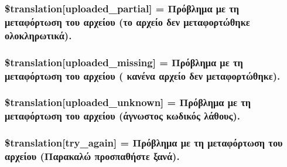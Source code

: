 \subsubsection[{\$translation}]{\setlength{\rightskip}{0pt plus 5cm}\$translation\mbox{[}\textquotesingle{}uploaded\+\_\+partial\textquotesingle{}\mbox{]} = \textquotesingle{}Πρόβλημα με τη μεταφόρτωση του αρχείου (το αρχείο δεν μεταφορτώθηκε ολοκληρωτικά).\textquotesingle{}}\label{class_8upload_8el___g_r_8php_a967c17da21b0a2d3bd65cca3a9ca0ea8}
\hypertarget{class_8upload_8el___g_r_8php_a0cce433260be65f1f35853a6b4b8952b}{}
\subsubsection[{\$translation}]{\setlength{\rightskip}{0pt plus 5cm}\$translation\mbox{[}\textquotesingle{}uploaded\+\_\+missing\textquotesingle{}\mbox{]} = \textquotesingle{}Πρόβλημα με τη μεταφόρτωση του αρχείου ( κανένα αρχείο δεν μεταφορτώθηκε).\textquotesingle{}}\label{class_8upload_8el___g_r_8php_a0cce433260be65f1f35853a6b4b8952b}
\hypertarget{class_8upload_8el___g_r_8php_a4a9168e922b827e6a28b5db1c00774ca}{}
\subsubsection[{\$translation}]{\setlength{\rightskip}{0pt plus 5cm}\$translation\mbox{[}\textquotesingle{}uploaded\+\_\+unknown\textquotesingle{}\mbox{]} = \textquotesingle{}Πρόβλημα με τη μεταφόρτωση του αρχείου (άγνωστος κωδικός λάθους).\textquotesingle{}}\label{class_8upload_8el___g_r_8php_a4a9168e922b827e6a28b5db1c00774ca}
\hypertarget{class_8upload_8el___g_r_8php_a3afc377bd803683314f413a814243066}{}
\subsubsection[{\$translation}]{\setlength{\rightskip}{0pt plus 5cm}\$translation\mbox{[}\textquotesingle{}try\+\_\+again\textquotesingle{}\mbox{]} = \textquotesingle{}Πρόβλημα με τη μεταφόρτωση του αρχείου (Παρακαλώ προσπαθήστε ξανά).\textquotesingle{}}\label{class_8upload_8el___g_r_8php_a3afc377bd803683314f413a814243066}
\hypertarget{class_8upload_8el___g_r_8php_a476278eb4a0c3df56af068e2d511a741}{}
